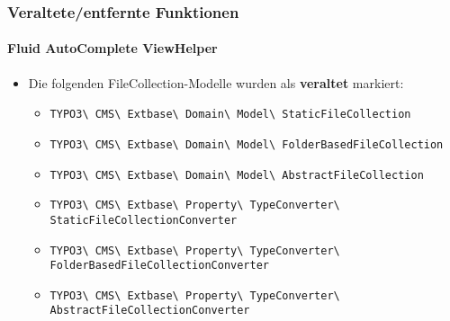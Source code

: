 \begin{frame}[fragile]
	\frametitle{Veraltete/entfernte Funktionen}
	\framesubtitle{Fluid AutoComplete ViewHelper}

	\begin{itemize}
		\item Die folgenden FileCollection-Modelle wurden als \textbf{veraltet} markiert:
			\vspace{0.4cm}
			\begin{itemize}\tiny
				\item \texttt{TYPO3\textbackslash
					CMS\textbackslash
					Extbase\textbackslash
					Domain\textbackslash
					Model\textbackslash
					StaticFileCollection}

				\item \texttt{TYPO3\textbackslash
					CMS\textbackslash
					Extbase\textbackslash
					Domain\textbackslash
					Model\textbackslash
					FolderBasedFileCollection}

				\item \texttt{TYPO3\textbackslash
					CMS\textbackslash
					Extbase\textbackslash
					Domain\textbackslash
					Model\textbackslash
					AbstractFileCollection}

				\item \texttt{TYPO3\textbackslash
					CMS\textbackslash
					Extbase\textbackslash
					Property\textbackslash
					TypeConverter\textbackslash
					StaticFileCollectionConverter}

				\item \texttt{TYPO3\textbackslash
					CMS\textbackslash
					Extbase\textbackslash
					Property\textbackslash
					TypeConverter\textbackslash
					FolderBasedFileCollectionConverter}

				\item \texttt{TYPO3\textbackslash
					CMS\textbackslash
					Extbase\textbackslash
					Property\textbackslash
					TypeConverter\textbackslash
					AbstractFileCollectionConverter}

			\end{itemize}

	\end{itemize}

\end{frame}


